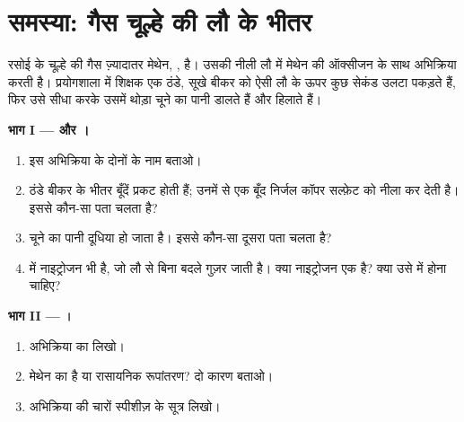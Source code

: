 \section{समस्या: गैस चूल्हे की लौ के भीतर}

\begin{problem}
\label{pb:g7:chemical-reactions:1}
रसोई के चूल्हे की गैस ज़्यादातर मेथेन, , है। उसकी नीली लौ में
मेथेन  की ऑक्सीजन के साथ अभिक्रिया करती है। प्रयोगशाला में शिक्षक एक
ठंडे, सूखे बीकर को ऐसी लौ के ऊपर कुछ सेकंड उलटा पकड़ते हैं, फिर उसे सीधा
करके उसमें थोड़ा चूने का पानी डालते हैं और
हिलाते हैं।

\medskip
\noindent\textbf{भाग I ---  और ।}
\begin{enumerate}
  \item इस अभिक्रिया के दोनों  के नाम बताओ।
  \item ठंडे बीकर के भीतर बूँदें प्रकट होती हैं; उनमें से एक बूँद निर्जल
        कॉपर सल्फ़ेट को नीला कर देती है। इससे कौन-सा  पता चलता है?
  \item चूने का पानी दूधिया हो जाता है। इससे कौन-सा दूसरा  पता चलता है?
  \item {} में नाइट्रोजन भी है, जो लौ से बिना बदले गुज़र जाती है।
        क्या नाइट्रोजन एक  है? क्या उसे  में होना
        चाहिए?
\end{enumerate}

\medskip
\noindent\textbf{भाग II --- ।}
\begin{enumerate}[resume]
  \item अभिक्रिया का  लिखो।
  \item मेथेन का   है या रासायनिक
        रूपांतरण? दो कारण बताओ।
  \item अभिक्रिया की चारों स्पीशीज़ के सूत्र लिखो।
\end{enumerate}


\end{problem}
